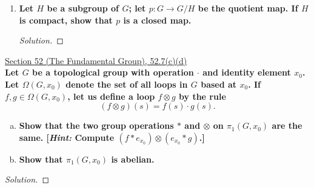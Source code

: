 \documentclass[11pt]{article}
\newenvironment{solution}
  {\renewcommand\qedsymbol{$\blacksquare$}\begin{proof}[Solution]}
  {\end{proof}}
\begin{document}
\begin{enumerate}
\begin{solution}
    To summarize, we have that $f^{-1}(A^C)$ is an open set in $G \times G$, and $\{ c\}$ and $B$ are each compact in $G$, with $\{c \} \times B \subseteq f^{-1}(A^C)$. It follows by Exercise 26.9 that there exist open sets $W$ and $V$ in $G$ such that
    \[
        \{ c \} \times B \subseteq W \times V \subseteq f^{-1}(A^C).
    \]
    Note that $c \in W$ by construction, and $W \times B \subseteq W \times V$. Consequently, since $W \times B \subseteq W \times V \subseteq f^{-1}(A^C)$, it follows that $f(W \times B) \subseteq A^C$, or equivalently
    \[
        W \cdot B^{-1} \subseteq A^C.
    \]
    It follows that $(W \cdot B^{-1}) \cap A = \varnothing$. Consequently, $wb^{-1} \neq a$ for any $w \in W, a \in A$ and $b \in B$. Equivalently, $w \neq ab$, so $W \cap (A \cdot B) = \varnothing$. \\

    For any arbitrary $c \in (A \cdot B)^C$, we have found a neighborhood $W$ of $c$ such that $W \cap (A \cdot B) = \varnothing$, or equivalently, $W \subseteq (A \cdot B)^C$. It follows by definition that $(A \cdot B)^C$ is open in $G$,
    so $A \cdot B$ is closed, as desired.
    \end{solution}

    \item \textbf{Let $H$ be a subgroup of $G$; let $p \colon G \rightarrow G/H$ be the quotient map. If $H$ is compact, show that $p$ is a closed map.}
    
    \begin{solution}
    
    \end{solution}
\end{enumerate}

\newpage

\underline{Section 52 (The Fundamental Group), 52.7(c)(d)} \\

\textbf{Let $G$ be a topological group with operation $\cdot$ and identity element $x_0$. Let $\Omega(G, x_0)$ denote the set of all loops in $G$ based at $x_0$. If $f, g \in \Omega(G, x_0)$, 
let us define a loop $f \otimes g$ by the rule}
\[
    (f \otimes g)(s) = f(s) \cdot g(s).
\]
\begin{enumerate}[a)]
    \item \textbf{Show that the two group operations $*$ and $\otimes$ on $\pi_1(G, x_0)$ are the same. [\textit{Hint:} Compute $(f * e_{x_0}) \otimes (e_{x_0} * g)$.]}
    \item \textbf{Show that $\pi_1(G, x_0)$ is abelian.}
\end{enumerate}

\begin{solution}

\end{solution}
\end{document}
